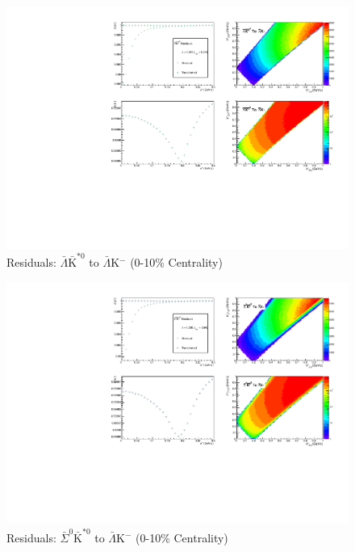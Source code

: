 \documentclass[../AnalysisNoteJBuxton.tex]{subfiles}
\begin{document}
\begin{figure}[h]
  \centering
  \includegraphics[width=\textwidth]{9_AdditionalFigures/Figures/Residuals/ALamKchM/Residuals_ALamKchM_0010_ALamAKSt0_MomResCrctn_NonFlatBgdCrctn_ResidualsIncluded_UsingCoulombOnlyInterpCfs.pdf}
  \caption[Residuals: $\bar{\Lambda}\bar{\mathrm{K}}^{*0}$ to $\bar{\Lambda}$K$^{-}$ (0-10\% Centrality)]{Residuals: $\bar{\Lambda}\bar{\mathrm{K}}^{*0}$ to $\bar{\Lambda}$K$^{-}$ (0-10\% Centrality)}
  \label{fig:Res_ALamKchM_0010_ALamAKSt0}
\end{figure}


\begin{figure}[h]
  \centering
  \includegraphics[width=\textwidth]{9_AdditionalFigures/Figures/Residuals/ALamKchM/Residuals_ALamKchM_0010_ASigma0AKSt0_MomResCrctn_NonFlatBgdCrctn_ResidualsIncluded_UsingCoulombOnlyInterpCfs.pdf}
  \caption[Residuals: $\bar{\Sigma}^{0}\bar{\mathrm{K}}^{*0}$ to $\bar{\Lambda}$K$^{-}$ (0-10\% Centrality)]{Residuals: $\bar{\Sigma}^{0}\bar{\mathrm{K}}^{*0}$ to $\bar{\Lambda}$K$^{-}$ (0-10\% Centrality)}
  \label{fig:Res_ALamKchM_0010_ASig0AKSt0}
\end{figure}
\end{document}
